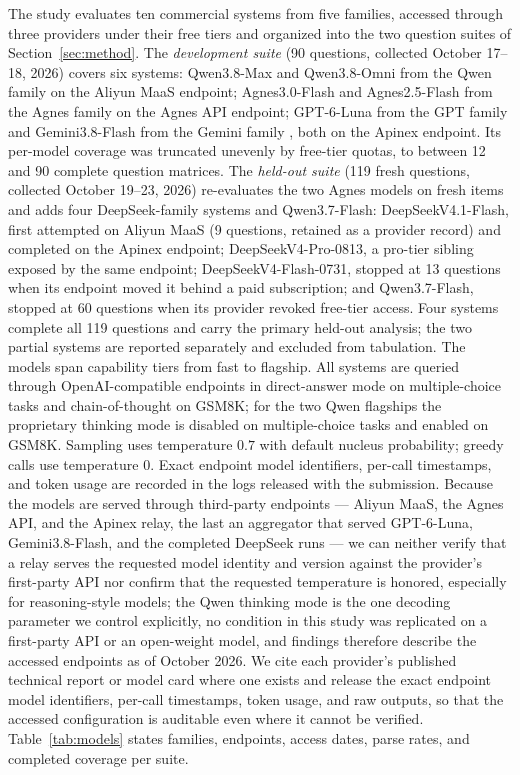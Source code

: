 The study evaluates ten commercial systems from five families, accessed through three providers under their free tiers and organized into the two question suites of Section~\ref{sec:method}. The \emph{development suite} (90 questions, collected October 17--18, 2026) covers six systems: Qwen3.8-Max and Qwen3.8-Omni from the Qwen family \citep{yang2025qwen3} on the Aliyun MaaS endpoint; Agnes3.0-Flash and Agnes2.5-Flash from the Agnes family \citep{agnesai2026} on the Agnes API endpoint; GPT-6-Luna from the GPT family \citep{openai2026gpt6} and Gemini3.8-Flash from the Gemini family \citep{google2026gemini38}, both on the Apinex endpoint. Its per-model coverage was truncated unevenly by free-tier quotas, to between 12 and 90 complete question matrices. The \emph{held-out suite} (119 fresh questions, collected October 19--23, 2026) re-evaluates the two Agnes models on fresh items and adds four DeepSeek-family systems \citep{deepseek2026api} and Qwen3.7-Flash: DeepSeekV4.1-Flash, first attempted on Aliyun MaaS (9 questions, retained as a provider record) and completed on the Apinex endpoint; DeepSeekV4-Pro-0813, a pro-tier sibling exposed by the same endpoint; DeepSeekV4-Flash-0731, stopped at 13 questions when its endpoint moved it behind a paid subscription; and Qwen3.7-Flash, stopped at 60 questions when its provider revoked free-tier access. Four systems complete all 119 questions and carry the primary held-out analysis; the two partial systems are reported separately and excluded from tabulation. The models span capability tiers from fast to flagship. All systems are queried through OpenAI-compatible endpoints in direct-answer mode on multiple-choice tasks and chain-of-thought on GSM8K; for the two Qwen flagships the proprietary thinking mode is disabled on multiple-choice tasks and enabled on GSM8K. Sampling uses temperature $0.7$ with default nucleus probability; greedy calls use temperature $0$. Exact endpoint model identifiers, per-call timestamps, and token usage are recorded in the logs released with the submission. Because the models are served through third-party endpoints --- Aliyun MaaS, the Agnes API, and the Apinex relay, the last an aggregator that served GPT-6-Luna, Gemini3.8-Flash, and the completed DeepSeek runs --- we can neither verify that a relay serves the requested model identity and version against the provider's first-party API nor confirm that the requested temperature is honored, especially for reasoning-style models; the Qwen thinking mode is the one decoding parameter we control explicitly, no condition in this study was replicated on a first-party API or an open-weight model, and findings therefore describe the accessed endpoints as of October 2026. We cite each provider's published technical report or model card where one exists and release the exact endpoint model identifiers, per-call timestamps, token usage, and raw outputs, so that the accessed configuration is auditable even where it cannot be verified. Table~\ref{tab:models} states families, endpoints, access dates, parse rates, and completed coverage per suite.

